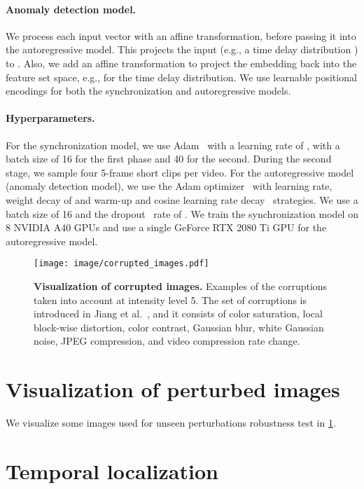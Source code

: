 \documentclass[10pt,twocolumn,letterpaper]{article}
\newcommand{\mypar}[1]{\vspace{-3mm}\paragraph{#1}}
\begin{document}
\mypar{Anomaly detection model.}
We process each input vector  with an affine transformation, before passing it into the autoregressive model. This projects the input (e.g., a time delay distribution ) to . Also, we add an affine transformation to project the embedding back into the feature set space, e.g.,  for the time delay distribution. We use learnable positional encodings for both the synchronization and autoregressive models. 



\mypar{Hyperparameters.}
For the synchronization model, we use Adam~\cite{kingma2014adam} with a learning rate of  , with a batch size of 16 for the first phase and 40 for the second. During the second stage, we sample four 5-frame short clips per video. For the autoregressive model (anomaly detection model), we use the Adam optimizer~\cite{kingma2014adam} with  learning rate, weight decay of  and warm-up and cosine learning rate decay~\cite{loshchilov2016sgdr} strategies. We use a batch size of 16 and the dropout~\cite{srivastava2014dropout} rate of . We train the synchronization model on 8 NVIDIA A40 GPUs and use a single GeForce RTX 2080 Ti GPU for the autoregressive model.

\begin{figure}[t!]
    \centering
    \texttt{[image: image/corrupted\_images.pdf]}
    \caption{\textbf{Visualization of corrupted images.} Examples of the corruptions taken into account at intensity level 5. The set of corruptions is introduced in Jiang et al.~\cite{jiang2020deeperforensics}, and it consists of color saturation, local block-wise distortion, color contrast, Gaussian blur, white Gaussian noise, JPEG compression, and video compression rate change.}
    \label{corrupted_images}
\end{figure} \section{Visualization of perturbed images}
We visualize some images used for unseen perturbations robustness test in \cref{corrupted_images}. 


\section{Temporal localization}
\end{document}
